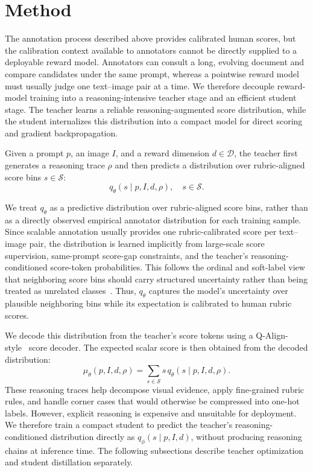 \documentclass{llmxive}
\begin{document}
\section{Method}

The annotation process described above provides calibrated human scores, but the calibration context available to annotators cannot be directly supplied to a deployable reward model. Annotators can consult a long, evolving document and compare candidates under the same prompt, whereas a pointwise reward model must usually judge one text--image pair at a time. We therefore decouple reward-model training into a reasoning-intensive teacher stage and an efficient student stage. The teacher learns a reliable reasoning-augmented score distribution, while the student internalizes this distribution into a compact model for direct scoring and gradient backpropagation.

Given a prompt $p$, an image $I$, and a reward dimension $d \in \mathcal{D}$, the teacher first generates a reasoning trace $\rho$ and then predicts a distribution over rubric-aligned score bins $s \in \mathcal{S}$:
\begin{equation}
q_\theta(s \mid p,I,d,\rho), \quad s \in \mathcal{S}.
\label{eq:method-score-distribution}
\end{equation}

We treat $q_\theta$ as a predictive distribution over rubric-aligned score bins, rather than as a directly observed empirical annotator distribution for each training sample. Since scalable annotation usually provides one rubric-calibrated score per text--image pair, the distribution is learned implicitly from large-scale score supervision, same-prompt score-gap constraints, and the teacher's reasoning-conditioned score-token probabilities. This follows the ordinal and soft-label view that neighboring score bins should carry structured uncertainty rather than being treated as unrelated classes~\cite{diaz2019soft,wen2023ordinal}. Thus, $q_\theta$ captures the model's uncertainty over plausible neighboring bins while its expectation is calibrated to human rubric scores.


We decode this distribution from the teacher's score tokens using a Q-Align-style~\cite{wu2023qalign} score decoder. The expected scalar score is then obtained from the decoded distribution:
\begin{equation}
\mu_\theta(p,I,d,\rho) = \sum_{s \in \mathcal{S}} s \, q_\theta(s \mid p,I,d,\rho).
\label{eq:method-expected-score}
\end{equation}
These reasoning traces help decompose visual evidence, apply fine-grained rubric rules, and handle corner cases that would otherwise be compressed into one-hot labels. However, explicit reasoning is expensive and unsuitable for deployment. We therefore train a compact student to predict the teacher's reasoning-conditioned distribution directly as $q_\phi(s \mid p,I,d)$, without producing reasoning chains at inference time. The following subsections describe teacher optimization and student distillation separately.
\end{document}
